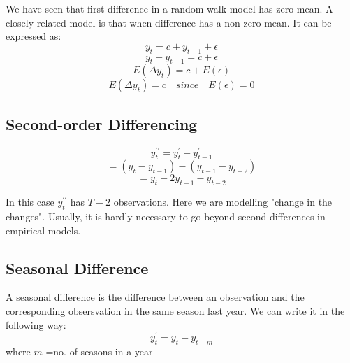 \documentclass{article}
\begin{document}
We have seen that first difference in a random walk model has zero mean. A closely related model is that when difference has a non-zero mean. It can be expressed as:
    $$ y_t=c+y_{t-1}+\epsilon $$
    $$ y_t - y_{t-1}=c+\epsilon $$
    $$ E(\Delta y_t)=c+E(\epsilon) $$
$$ E(\Delta y_t)=c \quad since \quad E(\epsilon)=0 $$ 

\subsection{Second-order Differencing}
$$y_t^{\prime\prime}=y_t^\prime-y_{t-1}^\prime$$
$$ = (y_t-y_{t-1})-(y_{t-1}-y_{t-2})$$
$$ = y_t-2y_{t-1}-y_{t-2}$$

In this case $y_t^{\prime\prime}$ has $T-2$ observations. Here we are modelling "change in the changes". Usually, it is hardly necessary to go beyond second differences in empirical models. 
\subsection{Seasonal Difference}
A seasonal difference is the difference between an observation and the corresponding obsersvation in the same season last year. We can write it in the following way:
        $$y_t^\prime=y_t-y_{t-m} $$
        where  $m$ =no. of seasons in a year
  
\end{document}
